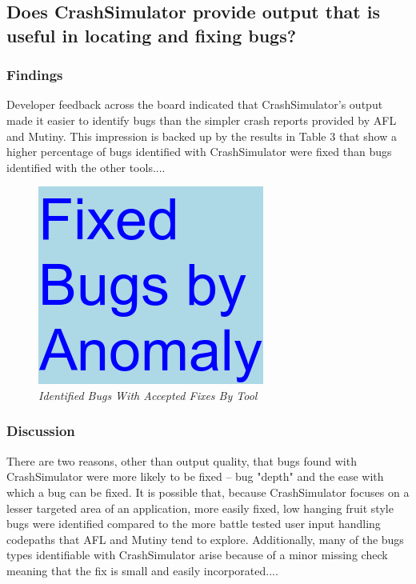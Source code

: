 \subsection{Does CrashSimulator provide output that is useful in locating
and fixing bugs?}


\subsubsection{Findings}

Developer feedback across the board indicated that CrashSimulator's output
made it easier to identify bugs than the simpler crash reports provided by
AFL and Mutiny.  This impression is backed up by the results in Table 3
that show a higher percentage of bugs identified with CrashSimulator were
fixed than bugs identified with the other tools....

\begin{figure}[t]
  \center{}
  \includegraphics[scale=.5]{images/table3}
  \caption{\emph{Identified Bugs With Accepted Fixes By Tool}}
  \label{fig-skill-exp}
\end{figure}


\subsubsection{Discussion}

There are two reasons, other than output quality, that bugs found with
CrashSimulator were more likely to be fixed -- bug "depth" and the ease
with which a bug can be fixed.  It is possible that, because CrashSimulator
focuses on a lesser targeted area of an application, more easily fixed, low
hanging fruit style bugs were identified compared to the more battle tested
user input handling codepaths that AFL and Mutiny tend to explore.
Additionally, many of the bugs types identifiable with CrashSimulator arise
because of a minor missing check meaning that the fix is small and easily
incorporated....
